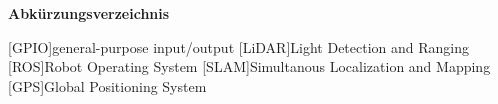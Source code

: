 \Huge\bf Abkürzungsverzeichnis \\
\normalsize\rm

\begin{acronym}

[GPIO]{general-purpose input/output}
[LiDAR]{Light Detection and Ranging}
[ROS]{Robot Operating System}
[SLAM]{Simultanous Localization and Mapping}
[GPS]{Global Positioning System}
    
\end{acronym}

\newpage